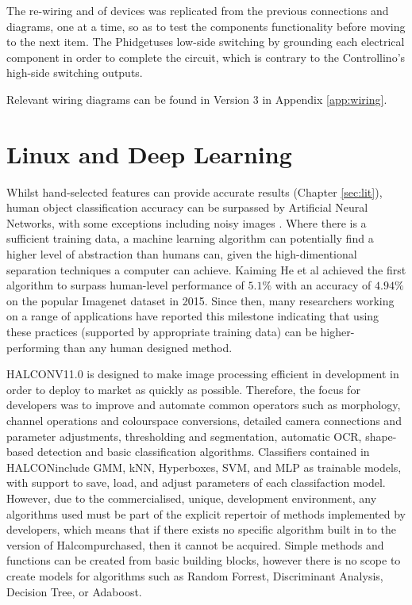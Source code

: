 \documentclass[fleqn,twoside]{article}
\begin{document}
The re-wiring and of devices was replicated from the previous connections and diagrams, one at a time, so as to test the components functionality before moving to the next item. The Phidget\texttrademark uses low-side switching by grounding each electrical component in order to complete the circuit, which is contrary to the Controllino\texttrademark's high-side switching outputs. 

Relevant wiring diagrams can be found in Version 3 in Appendix \ref{app:wiring}.




\newpage

\section{Linux and Deep Learning}
\label{sec:IV}


Whilst hand-selected features can provide accurate results (Chapter \ref{sec:lit}), human object classification accuracy can be surpassed by Artificial Neural Networks, with some exceptions including noisy images \cite{dodge}. Where there is a sufficient training data, a machine learning algorithm can potentially find a higher level of abstraction than humans can, given the high-dimentional separation techniques a computer can achieve. Kaiming He et al \cite{he2} achieved the first algorithm to surpass human-level performance of $5.1\%$ with an accuracy of $4.94\%$ on the popular Imagenet dataset in 2015. Since then, many researchers working on a range of applications have reported this milestone \cite{geirhos, saon, xiong, han} indicating that using these practices (supported by appropriate training data) can be higher-performing than any human designed method. 

HALCON\texttrademark V11.0 is designed to make image processing efficient in development in order to deploy to market as quickly as possible. Therefore, the focus for developers was to improve and automate common operators such as morphology, channel operations and colourspace conversions, detailed camera connections and parameter adjustments, thresholding and segmentation, automatic OCR, shape-based detection and basic classification algorithms. Classifiers contained in HALCON\texttrademark include GMM, kNN, Hyperboxes, SVM, and MLP as trainable models, with support to save, load, and adjust parameters of each classifaction model. However, due to the commercialised, unique, development environment, any algorithms used must be part of the explicit repertoir of methods implemented by developers, which means that if there exists no specific algorithm built in to the version of Halcom\texttrademark purchased, then it cannot be acquired. Simple methods and functions can be created from basic building blocks, however there is no scope to create models for algorithms such as Random Forrest, Discriminant Analysis, Decision Tree, or Adaboost. 
\end{document}

